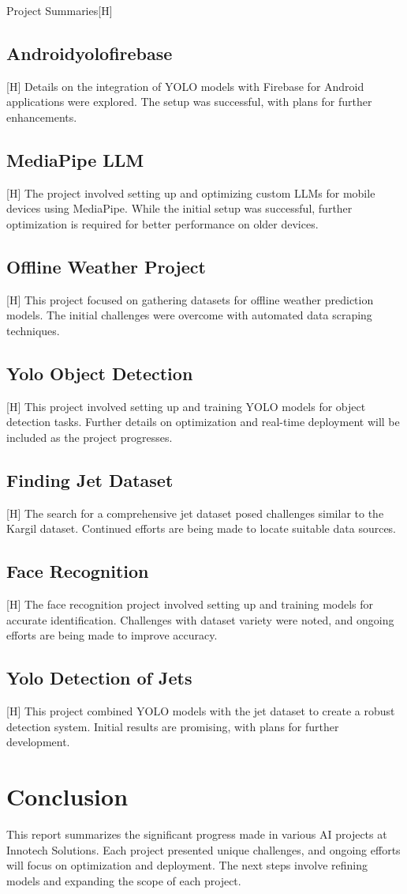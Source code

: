 \documentclass{report}
\begin{document}
{Project Summaries}[H]

\section{Androidyolofirebase}[H]
Details on the integration of YOLO models with Firebase for Android applications were explored. The setup was successful, with plans for further enhancements.

\section{MediaPipe LLM}[H]
The project involved setting up and optimizing custom LLMs for mobile devices using MediaPipe. While the initial setup was successful, further optimization is required for better performance on older devices.

\section{Offline Weather Project}[H]
This project focused on gathering datasets for offline weather prediction models. The initial challenges were overcome with automated data scraping techniques.

\section{Yolo Object Detection}[H]
This project involved setting up and training YOLO models for object detection tasks. Further details on optimization and real-time deployment will be included as the project progresses.

\section{Finding Jet Dataset}[H]
The search for a comprehensive jet dataset posed challenges similar to the Kargil dataset. Continued efforts are being made to locate suitable data sources.

\section{Face Recognition}[H]
The face recognition project involved setting up and training models for accurate identification. Challenges with dataset variety were noted, and ongoing efforts are being made to improve accuracy.

\section{Yolo Detection of Jets}[H]
This project combined YOLO models with the jet dataset to create a robust detection system. Initial results are promising, with plans for further development.

\chapter{Conclusion}
This report summarizes the significant progress made in various AI projects at Innotech Solutions. Each project presented unique challenges, and ongoing efforts will focus on optimization and deployment. The next steps involve refining models and expanding the scope of each project.
\end{document}
